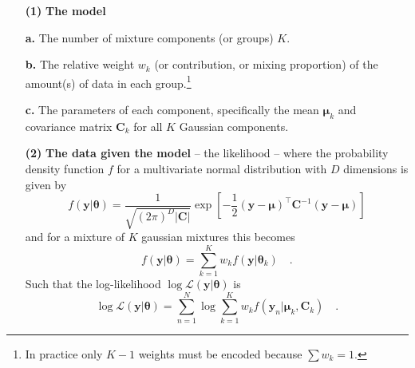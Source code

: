 \documentclass{elsarticle}
\newcommand{\vect}[1]{\boldsymbol{\mathbf{#1}}}
\renewcommand{\vec}[1]{\vect{#1}}
\def\cov{C}
\def\veccov{\vect{\cov}}
\def\vecmean{\vect{\mu}}
\def\weight{w}
\def\datum{y}
\def\data{\vect{\datum}}
\def\likelihood{\mathcal{L}}
\begin{document}
\begin{itemize}
    \item[\textbf{(1)}] \textbf{The model}
    \item[\textbf{a.}]  The number of mixture components (or groups) $K$.
    \item[\textbf{b.}]  The relative weight $w_k$ (or contribution, or mixing 
                        proportion) of the amount(s) of data in each group.\footnote{In practice only $K - 1$ weights must be encoded because $\sum\weight_k = 1$.}


    \item[\textbf{c.}]  The parameters of each component, specifically the mean
                        $\vecmean_k$ and covariance matrix $\veccov_k$ for all 
                        $K$ Gaussian components.

    \item[\textbf{(2)}] \textbf{The data given the model} -- the likelihood --
                        where the probability density function $f$ for a
                        multivariate normal distribution with $D$ dimensions
                        is given by
                        \begin{equation}
                            f(\vec{\data}|\vec{\theta}) = \frac{1}{\sqrt{(2\pi)^{D}|\veccov|}}\exp{\left[-\frac{1}{2}(\vec{\data} - \vecmean)^\intercal\veccov^{-1}(\vec{\data}-\vecmean)\right]}
                        \end{equation}
                        \noindent{}and for a mixture of $K$ gaussian mixtures
                        this becomes
                        \begin{equation}
                            f(\vec{\data}|\vec{\theta}) = \sum_{k=1}^{K}\weight_{k}f(\vec{\data}|\vec{\theta}_{k}) \quad .
                        \end{equation}
                        \noindent{}Such that the log-likelihood $\log\likelihood(\vec{\data}|\vec{\theta})$ is
                        \begin{equation}
                            \log\likelihood(\vec{\data}|\vec{\theta}) = \sum_{n=1}^{N}\log\sum_{k=1}^{K}\weight_{k}f(\vec{\data}_{n}|\vecmean_{k},\veccov_{k}) \quad .
                        \end{equation}



\end{itemize}
\end{document}
